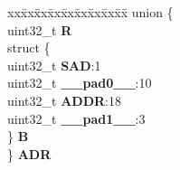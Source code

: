 \begin{DoxyCompactItemize}
\begin{tabbing}
\end{tabbing}\item 
\mbox{\label{structFLASH__tag_abb37f248b7dacfd5e2987fc10a8566f5}} 
\begin{tabbing}
xx\=xx\=xx\=xx\=xx\=xx\=xx\=xx\=xx\=\kill
union \{\\
\>uint32\_t {\bfseries R}\\
\>struct \{\\
\>\>uint32\_t {\bfseries SAD}:1\\
\>\>uint32\_t {\bfseries \_\_pad0\_\_}:10\\
\>\>uint32\_t {\bfseries ADDR}:18\\
\>\>uint32\_t {\bfseries \_\_pad1\_\_}:3\\
\>\} {\bfseries B}\\
\} {\bfseries ADR}\\


\end{tabbing}
\end{DoxyCompactItemize}
